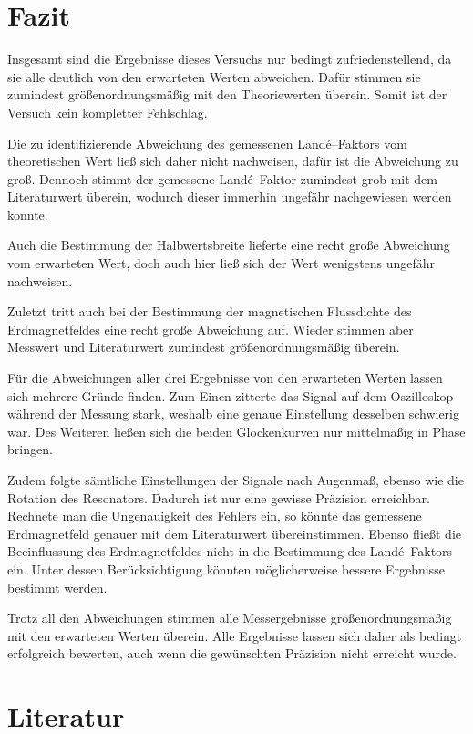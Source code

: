 \documentclass[12pt,a4paper]{scrartcl}
\numberwithin{equation}{section} %
\begin{document}
\clearpage
\hypertarget{fazit}{\section{Fazit}\label{fazit}}
Insgesamt sind die Ergebnisse dieses Versuchs nur bedingt zufriedenstellend, da sie alle deutlich von den erwarteten Werten abweichen. Dafür stimmen sie zumindest größenordnungsmäßig mit den Theoriewerten überein. Somit ist der Versuch kein kompletter Fehlschlag.

Die zu identifizierende Abweichung des gemessenen Landé--Faktors vom theoretischen Wert ließ sich daher nicht nachweisen, dafür ist die Abweichung zu groß. Dennoch stimmt der gemessene Landé--Faktor zumindest grob mit dem Literaturwert überein, wodurch dieser immerhin ungefähr nachgewiesen werden konnte.

Auch die Bestimmung der Halbwertsbreite lieferte eine recht große Abweichung vom erwarteten Wert, doch auch hier ließ sich der Wert wenigstens ungefähr nachweisen.

Zuletzt tritt auch bei der Bestimmung der magnetischen Flussdichte des Erdmagnetfeldes eine recht große Abweichung auf. Wieder stimmen aber Messwert und Literaturwert zumindest größenordnungsmäßig überein.

Für die Abweichungen aller drei Ergebnisse von den erwarteten Werten lassen sich mehrere Gründe finden. Zum Einen zitterte das Signal auf dem Oszilloskop während der Messung stark, weshalb eine genaue Einstellung desselben schwierig war. Des Weiteren ließen sich die beiden Glockenkurven nur mittelmäßig in Phase bringen.

Zudem folgte sämtliche Einstellungen der Signale nach Augenmaß, ebenso wie die Rotation des Resonators. Dadurch ist nur eine gewisse Präzision erreichbar. Rechnete man die Ungenauigkeit des Fehlers ein, so könnte das gemessene Erdmagnetfeld genauer mit dem Literaturwert übereinstimmen. Ebenso fließt die Beeinflussung des Erdmagnetfeldes nicht in die Bestimmung des Landé--Faktors ein. Unter dessen Berücksichtigung könnten möglicherweise bessere Ergebnisse bestimmt werden.

Trotz all den Abweichungen stimmen alle Messergebnisse größenordnungsmäßig mit den erwarteten Werten überein. Alle Ergebnisse lassen sich daher als bedingt erfolgreich bewerten, auch wenn die gewünschten Präzision nicht erreicht wurde.

\clearpage
\hypertarget{literatur}{%
\section{Literatur}\label{literatur}}
\renewcommand{\section}[2]{}
\end{document}
